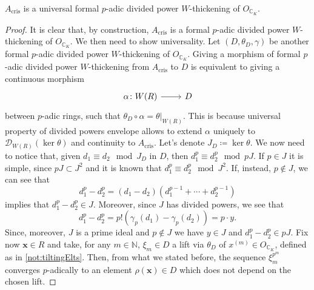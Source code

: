 \begin{prop}
	$A_{\mathrm{cris}}$ is a universal formal $p$-adic divided power $W$-thickening of
	$O_{\mathbb{C}_K}$.
\end{prop}
\begin{proof}
	It is clear that, by construction, $A_{\mathrm{cris}}$ is a
	formal $p$-adic divided power $W$-thickening of $O_{\mathbb{C}_K}$.
	We then need to show universality.
	Let $\left(D, \theta_D, \gamma\right)$ be another formal $p$-adic divided power
	$W$-thickening of $O_{\mathbb{C}_K}$.
	Giving a morphism of formal $p$-adic divided power $W$-thickening
	from $A_{\mathrm{cris}}$ to $D$ is equivalent to giving
	a continuous morphism
	\begin{equation*}
	\begin{tikzcd}[row sep = 0ex
		,/tikz/column 1/.append style={anchor=base east}
		,/tikz/column 2/.append style={anchor=base west}]
		\alpha\colon W(R) \arrow[r, "", rightarrow] &
		D
	\end{tikzcd}
	\end{equation*} 
	between $p$-adic rings, such that $\theta_D \circ \alpha = \left.\theta\right|_{ W(R) }$.
	This is because universal property of divided powers envelope
	allows to extend $\alpha$ uniquely to $\mathcal{D}_{W(R)}(\ker\theta)$
	and continuity to $A_{\mathrm{cris}}$.
	Let's denote $J_D \coloneqq \ker\theta$.
	We now need to notice that, given $d_1 \equiv d_2 \mod J_D$ in $D$,
	then $d_1^p \equiv d_2^p \mod pJ$.
	If $p \in J$ it is simple, since $pJ \subset J^2$ and
	it is known that $d_1^p \equiv d_2^p \mod J^2$.
	If, instead, $p \notin J$, we can see that 
	\begin{equation*}
		d_1^p - d_2^p = \left( d_1 - d_2 \right) 
		\left( d_1^{p-1} + \cdots + d_2^{p-1} \right)
	\end{equation*}
	implies that $d_1^p - d_2^p \in J$.
	Moreover, since $J$ has divided powers, we see that
	\begin{equation*}
		d_1^p - d_2^p = p! \left( \gamma_p(d_1) - \gamma_p(d_2) \right) = p \cdot y
	.\end{equation*}
	Since, moreover, $J$ is a prime ideal and $p \notin J$
	we have $y \in J$ and $d_1^p - d_2^p \in pJ$.
	Fix now $\mathbf{x} \in R$ and take, for any $m \in \mathbb{N}$, 
	$\xi_m \in D$ a lift via $\theta_D$ of $x^{(m)} \in O_{\mathbb{C}_K}$, defined
	as in \cref{not:tiltingElts}.
	Then, from what we stated before, the sequence $\xi_m^{p^m}$ converges
	$p$-adically to an element $\rho(\mathbf{x}) \in D$ which does not depend on the chosen lift.

\end{proof}
